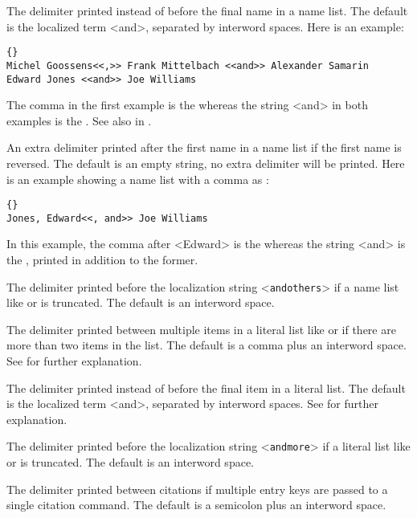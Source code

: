 \begin{ltxsyntax}
The delimiter printed instead of  before the final name in a name list. The default is the localized term <and>, separated by interword spaces. Here is an example:

\begin{lstlisting}[style=latex]{}
Michel Goossens<<,>> Frank Mittelbach <<and>> Alexander Samarin
Edward Jones <<and>> Joe Williams
\end{lstlisting}
%
The comma in the first example is the  whereas the string <and> in both examples is the . See also  in .

An extra delimiter printed after the first name in a name list if the first name is reversed. The default is an empty string, \ie no extra delimiter will be printed. Here is an example showing a name list with a comma as :

\begin{lstlisting}[style=latex]{}
Jones, Edward<<, and>> Joe Williams
\end{lstlisting}
%
In this example, the comma after <Edward> is the  whereas the string <and> is the , printed in addition to the former.

The delimiter printed before the localization string <\texttt{andothers}> if a name list like  or  is truncated. The default is an interword space.

The delimiter printed between multiple items in a literal list like  or  if there are more than two items in the list. The default is a comma plus an interword space. See  for further explanation.

The delimiter printed instead of  before the final item in a literal list. The default is the localized term <and>, separated by interword spaces. See  for further explanation.

The delimiter printed before the localization string <\texttt{andmore}> if a literal list like  or  is truncated. The default is an interword space.

The delimiter printed between citations if multiple entry keys are passed to a single citation command. The default is a semicolon plus an interword space.


\end{ltxsyntax}
